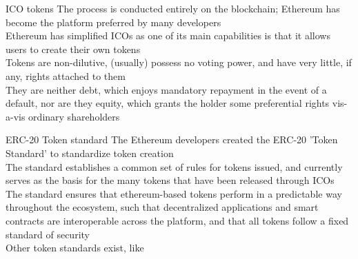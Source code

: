 \documentclass[10pt]{beamer}
\begin{document}

\begin{frame}{ICO tokens}
	The process is conducted entirely on the blockchain; Ethereum has become the platform preferred by many developers\\ \vspace{3mm}
	Ethereum has simplified ICOs as one of its main capabilities is that it allows users to create their own tokens\\ \vspace{3mm}
	Tokens are non-dilutive, (usually) possess no voting power, and have very little, if any, rights attached to them \\ \vspace{3mm}
	They are neither debt, which enjoys mandatory repayment in the event of a default, nor are they equity, which grants the holder some preferential rights vis-a-vis ordinary shareholders
\end{frame}


\begin{frame}{ERC-20 Token standard}
	The Ethereum developers created the ERC-20 'Token Standard' to standardize token creation\\ \vspace{3mm}
	The standard establishes a common set of rules for tokens issued, and currently serves as the basis for the many tokens that have been released through ICOs \\ \vspace{3mm}
	The standard ensures that ethereum-based tokens perform in a predictable way throughout the ecosystem, such that decentralized applications and smart contracts are interoperable across the platform, and that all tokens follow a fixed standard of security\\ \vspace{3mm}
	Other token standards exist, like
\end{frame}

\end{document}
